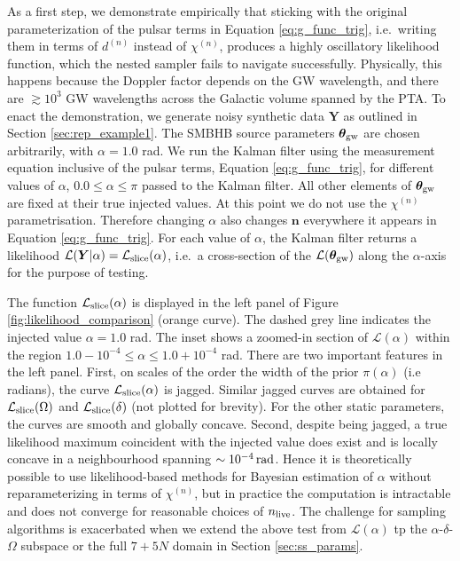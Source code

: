\documentclass[fleqn,usenatbib,useAMS]{mnras}
\begin{document}
As a first step, we demonstrate empirically that sticking with the original parameterization of the pulsar terms in Equation \eqref{eq:g_func_trig}, i.e.\ writing them in terms of $d^{(n)}$ instead of $\chi^{(n)}$, produces a highly oscillatory likelihood function, which the nested sampler fails to navigate successfully. Physically, this happens because the Doppler factor depends on the GW wavelength, and there are $\gtrsim 10^3$ GW wavelengths across the Galactic volume spanned by the PTA. To enact the demonstration, we generate noisy synthetic data $\boldsymbol{Y}$ as outlined in Section \ref{sec:rep_example1}. The SMBHB source parameters $\boldsymbol{\theta}_{\rm gw}$ are chosen arbitrarily, with $\alpha = 1.0 $ rad. We run the Kalman filter using the measurement equation inclusive of the pulsar terms, Equation \eqref{eq:g_func_trig}, for different values of $\alpha$, $ 0.0 \le \alpha \le \pi$ passed to the  Kalman filter. All other elements of $\boldsymbol{\theta}_{\rm gw}$ are fixed at their true injected values. At this point we do not use the $\chi^{(n)}$ parametrisation. Therefore changing $\alpha$ also changes $\boldsymbol{n}$ everywhere it appears in Equation \eqref{eq:g_func_trig}. For each value of $\alpha$, the Kalman filter returns a likelihood $\mathcal{L}(\boldsymbol{Y} | \alpha) = \mathcal{L}_{\rm slice}(\alpha)$, i.e.\ a cross-section of the $\mathcal {L}(\boldsymbol{\theta}_{\rm gw})$ along the $\alpha$-axis for the purpose of testing. \newline 


The function $\mathcal{L}_{\rm slice}(\alpha)$ is displayed in the left panel of Figure \ref{fig:likelihood_comparison} (orange curve). The dashed grey line indicates the injected value $\alpha= 1.0$ rad. The inset shows a zoomed-in section of $\mathcal{L}(\alpha)$ within the region $ 1.0 - 10^{-4} \le \alpha \le 1.0 +10^{-4}$ rad.  There are two important features in the left panel. First, on scales of the order the width of the prior $\pi(\alpha)$ (i.e radians), the curve $\mathcal{L}_{\rm slice}(\alpha)$ is jagged. Similar jagged curves are obtained for $\mathcal{L}_{\rm slice}(\Omega)$ and $\mathcal{L}_{\rm slice}(\delta)$ (not plotted for brevity). For the other static parameters, the curves are smooth and globally concave. Second, despite being jagged, a true likelihood maximum coincident with the injected value does exist and is locally concave in a neighbourhood spanning $\sim 10^{-4} \, {\rm rad}$. Hence it is theoretically possible to use likelihood-based methods for Bayesian estimation of $\alpha$ without reparameterizing in terms of $\chi^{(n)}$, but in practice the computation is intractable and does not converge for reasonable choices of $n_{\rm live}$. The challenge for sampling algorithms is exacerbated when we extend the above test from $\mathcal{L}(\alpha)$ tp the $\alpha$-$\delta$-$\Omega$ subspace or the full $7 + 5N$ domain in Section \ref{sec:ss_params}. \newline 
\end{document}
